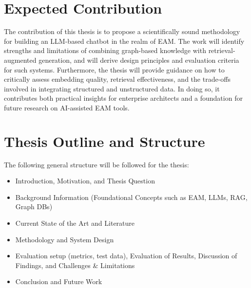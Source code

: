 \documentclass[english]{lni}
\begin{document}
\section{Expected Contribution}
The contribution of this thesis is to propose a scientifically sound methodology for building an LLM-based chatbot in the realm of EAM. The work will identify strengths and limitations of combining graph-based knowledge with retrieval-augmented generation, and will derive design principles and evaluation criteria for such systems. Furthermore, the thesis will provide guidance on how to critically assess embedding quality, retrieval effectiveness, and the trade-offs involved in integrating structured and unstructured data. In doing so, it contributes both practical insights for enterprise architects and a foundation for future research on AI-assisted EAM tools.

\section{Thesis Outline and Structure}
The following general structure will be followed for the thesis:

\begin{itemize}
    \item Introduction, Motivation, and Thesis Question
    \item Background Information (Foundational Concepts such as EAM, LLMs, RAG, Graph DBs)
    \item Current State of the Art and Literature
    \item Methodology and System Design
    \item Evaluation setup (metrics, test data), Evaluation of Results, Discussion of Findings, and Challenges \& Limitations
    \item Conclusion and Future Work
\end{itemize}




\printbibliography
\end{document}
